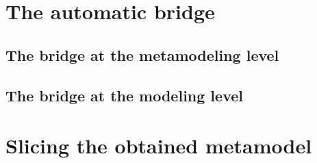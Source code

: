 \section{The automatic bridge}\label{sec:framework}

\subsection{The bridge at the metamodeling level}\label{sec:metamodelLevel}

\subsection{The bridge at the modeling level}\label{sec:modeLevel}

\section{Slicing the obtained metamodel}\label{sec:slicing}
